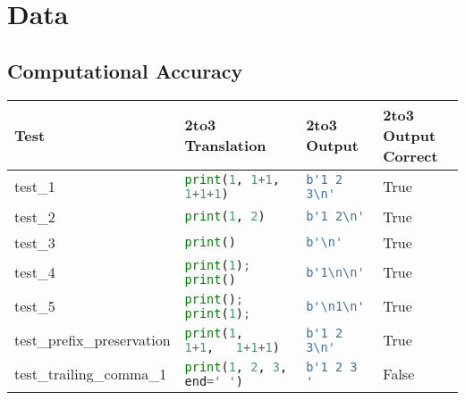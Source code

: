 \section{Data}
\label{appendix:Data}
\subsection{Computational Accuracy}

\begin{table*}[ht]
    \centering
    \begin{tabular}{@{}l|lll@{}}
    \toprule
    Test                                  & 2to3 Translation                      & 2to3 Output                            & 2to3 Output Correct \\ \midrule
    test\_1                               & \lstinline[language=Python, style=pythonstyle]|print(1, 1+1, 1+1+1)                 | & \lstinline[language=Python, style=pythonstyle]|b'1 2 3\n'  |            & True                \\
    test\_2                               & \lstinline[language=Python, style=pythonstyle]|print(1, 2)                          | & \lstinline[language=Python, style=pythonstyle]|b'1 2\n'   |             & True                \\
    test\_3                               & \lstinline[language=Python, style=pythonstyle]|print()                              | & \lstinline[language=Python, style=pythonstyle]|b'\n'    |               & True                \\
    test\_4                               & \lstinline[language=Python, style=pythonstyle]|print(1); print()                    | & \lstinline[language=Python, style=pythonstyle]|b'1\n\n' |& True                \\
    test\_5                               & \lstinline[language=Python, style=pythonstyle]|print(); print(1);                   | & \lstinline[language=Python, style=pythonstyle]|b'\n1\n' |& True                \\
    test\_prefix\_preservation            & \lstinline[language=Python, style=pythonstyle]|print(1,   1+1,   1+1+1)             | & \lstinline[language=Python, style=pythonstyle]|b'1 2 3\n'  |            & True                \\
    test\_trailing\_comma\_1              & \lstinline[language=Python, style=pythonstyle]|print(1, 2, 3, end=' ')              | & \lstinline[language=Python, style=pythonstyle]|b'1 2 3 '   |                           & False               \\

\end{tabular}
\end{table*}
